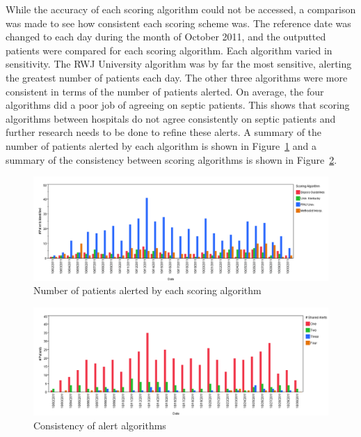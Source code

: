 \documentclass{sig-alternate}
\begin{document}
While the accuracy of each scoring algorithm could not be accessed, a comparison was made to see how consistent each scoring scheme was.  The reference date was changed to each day during the month of October 2011, and the outputted patients were compared for each scoring algorithm.  Each algorithm varied in sensitivity.  The RWJ University algorithm was by far the most sensitive, alerting the greatest number of patients each day.  The other three algorithms were more consistent in terms of the number of patients alerted.  On average, the four algorithms did a poor job of agreeing on septic patients.  This shows that scoring algorithms between hospitals do not agree consistently on septic patients and further research needs to be done to refine these alerts.  A summary of the number of patients alerted by each algorithm is shown in Figure~\ref{fig:num_patients} and a summary of the consistency between scoring algorithms is shown in Figure~\ref{fig:num_alerts}.

\begin{figure}
	\begin{center}
		\includegraphics[width=1.0\linewidth]{NumPatientsComp.png}
	\end{center}
	\caption{Number of patients alerted by each scoring algorithm}
	\label{fig:num_patients}
\end{figure}

\begin{figure}
	\begin{center}
		\includegraphics[width=1.0\linewidth]{ScoringComparision_Similarities.png}
	\end{center}
	\caption{Consistency of alert algorithms}
	\label{fig:num_alerts}
\end{figure}
\end{document}
